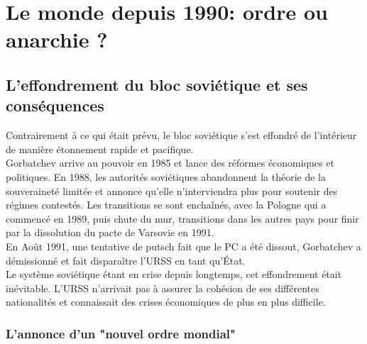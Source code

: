 \documentclass[10pt, a4paper, openany]{book}
\begin{document}
\section{Le monde depuis 1990: ordre ou anarchie ?}

\subsection{L'effondrement du bloc soviétique et ses conséquences}

Contrairement à ce qui était prévu, le bloc soviétique s'est effondré de l'intérieur de manière étonnement rapide et pacifique. \\
Gorbatchev arrive au pouvoir en 1985 et lance des réformes économiques et politiques. En 1988, les autorités soviétiques abandonnent la théorie de la souveraineté limitée et annonce qu'elle n'interviendra plus pour soutenir des régimes contestés. Les transitions se sont enchaînés, avec la Pologne qui a commencé en 1989, puis chute du mur, transitions dans les autres pays pour finir par la dissolution du pacte de Varsovie en 1991. \\
En Août 1991, une tentative de putsch fait que le PC a été dissout, Gorbatchev a démissionné et fait disparaître l'URSS en tant qu'État. \\
Le système soviétique étant en crise depuis longtemps, cet effondrement était inévitable. L'URSS n'arrivait pas à assurer la cohésion de ses différentes nationalités et connaissait des crises économiques de plus en plus difficile. 

\subsubsection{L'annonce d'un "nouvel ordre mondial"}
\end{document}
